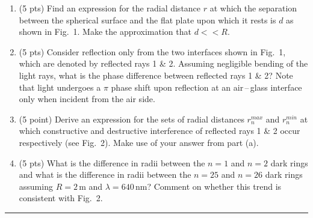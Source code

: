 \documentclass[12pt]{article}
\begin{document}
\begin{enumerate}[label=(\alph*)]
\item (5 pts)
Find an expression for the radial distance $r$ at which the separation between the spherical surface and the flat plate upon which it rests is $d$ as shown in Fig.~1. Make the approximation that $d << R$. 

\item (5 pts)
Consider reflection only from the two interfaces shown in Fig.~1,
which are denoted by reflected rays 1 \& 2. Assuming negligible bending
of the light rays, what is the phase difference between reflected rays
1 \& 2? Note that light undergoes a $\pi$ phase shift upon reflection at an
air\,--\,glass interface only when incident from the air side.

\item (5 point)
Derive an expression for the sets of radial distances $r_n^{max}$ and $r_n^{min}$
at which constructive and destructive interference of reflected rays 1
\& 2 occur respectively (see Fig.~2). Make use of your answer from
part (a).

\item (5 pts)
What is the difference in radii between the $n = 1$ and $n = 2$ dark rings
and what is the difference in radii between the $n = 25$ and $n = 26$ dark
rings assuming $R = 2$\,m and $\lambda = 640$\,nm? Comment on whether
this trend is consistent with Fig.~2.

\end{enumerate}
\bigskip


{\color{Sepia} \hrule}
\end{document}
